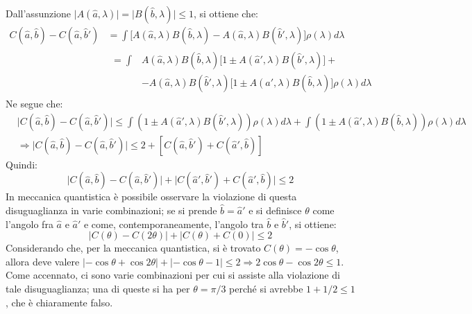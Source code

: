 \documentclass[11pt, a4paper]{scrartcl} %
\numberwithin{equation}{subsection}
\theoremstyle{style2}
\theoremstyle{style1}
\begin{document}
Dall'assunzione $\lvert A(\hat{a},\lambda ) \rvert = \lvert B(\hat{b},\lambda ) \rvert \le  1$, si ottiene che:
\[
\begin{split}
	C(\hat{a},\hat{b}) - C(\hat{a},\hat{b}') &=\int \Big[A(\hat{a},\lambda ) B(\hat{b},\lambda ) - A(\hat{a},\lambda ) B(\hat{b}', \lambda )\Big]\rho (\lambda ) d\lambda \\
						 &\begin{split}
						 	=\int &A(\hat{a},\lambda ) B(\hat{b},\lambda ) \big[1 \pm A(\hat{a}', \lambda ) B(\hat{b}', \lambda )\big] +\\
							      &- A(\hat{a},\lambda ) B(\hat{b}',\lambda ) \big[1\pm A(\hat{a}' ,\lambda ) B(\hat{b},\lambda )\big] \rho (\lambda ) d \lambda 
						 \end{split}
\end{split}
\] 
Ne segue che:
\begin{equation*}
	\begin{split}
		&\lvert C(\hat{a},\hat{b}) - C(\hat{a},\hat{b}') \rvert \le \int \left(1\pm A(\hat{a}',\lambda ) B(\hat{b}' ,\lambda )\right) \rho (\lambda ) d\lambda + \int \left( 1 \pm A(\hat{a}', \lambda ) B(\hat{b},\lambda )\right) \rho (\lambda ) d\lambda \\
		&\Rightarrow \lvert C(\hat{a},\hat{b}) - C(\hat{a},\hat{b}') \rvert \le 2 + \left[ C(\hat{a},\hat{b}') + C(\hat{a}', \hat{b}) \right]
	\end{split}
\end{equation*}
Quindi:
\begin{equation}
	\lvert C(\hat{a},\hat{b}) - C(\hat{a}, \hat{b}') \rvert + \lvert C(\hat{a}', \hat{b}') + C(\hat{a}', \hat{b}) \rvert \le  2 
\end{equation}
In meccanica quantistica \`e possibile osservare la violazione di questa disuguaglianza in varie combinazioni; se si prende $\hat{b}= \hat{a}'$ e si definisce $\theta $ come l'angolo fra $\hat{a}$ e $\hat{a}'$ e come, contemporaneamente, l'angolo tra $\hat{b}$ e $\hat{b}'$, si ottiene:
\[
\lvert C(\theta ) - C(2\theta )  \rvert + \lvert C(\theta ) + C(0)  \rvert \le 2 
\] 
Considerando che, per la meccanica quantistica, si \`e trovato $C(\theta ) = - \cos \theta $, allora deve valere $\lvert - \cos \theta + \cos 2\theta  \rvert + \lvert -\cos \theta - 1 \rvert \le 2\Rightarrow 2 \cos \theta  - \cos 2 \theta \le 1 $.
Come accennato, ci sono varie combinazioni per cui si assiste alla violazione di tale disuguaglianza; una di queste si ha per $\theta = \pi / 3$ perch\'e si avrebbe $1 + 1 / 2 \le 1$, che \`e chiaramente falso.
\end{document}
